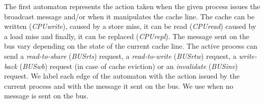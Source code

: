 The first automaton represents the action taken when the given process
issues the broadcast message and/or when it manipulates the cache
line.
%
The cache can be written (\emph{CPUwrite}), caused by a store miss, it
can be read (\emph{CPUread}) caused by a load miss and finally, it can
be replaced (\emph{CPUrepl}).
%
The message sent on the bus vary depending on the state of the current
cache line. The active process can send a \emph{read-to-share}
(\emph{BUSrts}) request, a \emph{read-to-write} (\emph{BUSrtw})
request, a \emph{write-back} (\emph{BUSwb}) request (in case of cache
eviction) or an \emph{invalidate} (\emph{BUSinv}) request. We label
each edge of the automaton with the action
%
%
issued by the current process and with the message %
%
it sent on the bus. We use
%
%
when no message is sent on the bus.

